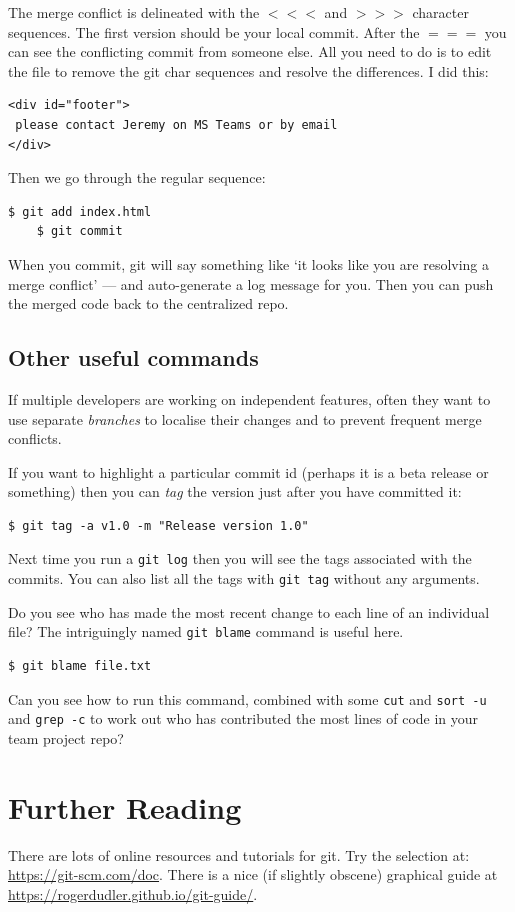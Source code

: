 \documentclass{article}
\begin{document}
The merge conflict is delineated with the $<<<$ and $>>>$ character sequences. The first version should be your local commit. After the $===$
you can see the conflicting commit from someone else. All you need to
do is to edit the file to remove the git char sequences and resolve the
differences. I did this:

\begin{verbatim}
<div id="footer">
 please contact Jeremy on MS Teams or by email
</div>
\end{verbatim}

Then we go through the regular sequence:


\begin{lstlisting}[style=BashInputStyle]
    $ git add index.html
    $ git commit
\end{lstlisting}

When you commit, git will say something like `it looks like you are resolving a
merge conflict' --- and auto-generate a log message for you. Then you can push the merged code back to the centralized repo.


\subsection*{Other useful commands}

If multiple developers are working on independent features, often they want
to use separate \emph{branches} to localise their changes and to prevent
frequent merge conflicts.

If you want to highlight a particular commit id (perhaps it is a beta release or something) then you can \emph{tag} the version just after you have committed it:

\begin{lstlisting}[style=BashInputStyle]
    $ git tag -a v1.0 -m "Release version 1.0"
\end{lstlisting}

Next time you run a \texttt{git log} then you will see the tags associated with the commits. You can also list all the tags with \texttt{git tag} without any arguments.


Do you see who has made the most recent change to each line of an individual file? The intriguingly named \texttt{git blame} command is useful here.


\begin{lstlisting}[style=BashInputStyle]
    $ git blame file.txt
\end{lstlisting}

Can you see how to run this command, combined with some \texttt{cut} and \texttt{sort -u} and \texttt{grep -c} to work out who has contributed the most lines of code in your team project repo?



\section*{Further Reading}

There are lots of online resources and tutorials for git.
Try the selection at: \url{https://git-scm.com/doc}.
There is a nice (if slightly obscene) graphical guide at 
\url{https://rogerdudler.github.io/git-guide/}.
\end{document}
